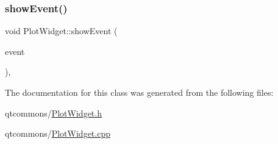 \mbox{\label{class_plot_widget_aeae368be52406c92818fab8095d9aa68}} 
\subsubsection{\texorpdfstring{showEvent()}{showEvent()}}
{\footnotesize\ttfamily void Plot\+Widget\+::show\+Event (\begin{DoxyParamCaption}\item[{Q\+Show\+Event $\ast$}]{event }\end{DoxyParamCaption})\hspace{0.3cm}{\ttfamily [override]}, {\ttfamily [protected]}}



The documentation for this class was generated from the following files\+:\begin{DoxyCompactItemize}
\item 
qtcommons/\mbox{\hyperlink{_plot_widget_8h}{Plot\+Widget.\+h}}\item 
qtcommons/\mbox{\hyperlink{_plot_widget_8cpp}{Plot\+Widget.\+cpp}}\end{DoxyCompactItemize}
